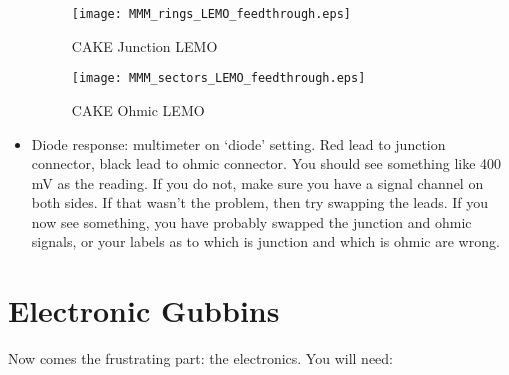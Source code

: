 \documentclass[11pt]{report}
\begin{document}
\begin{itemize}
\begin{figure}
\centering
 \texttt{[image: MMM\_rings\_LEMO\_feedthrough.eps]}
 \caption{CAKE Junction LEMO}
 \label{fig:CAKE_junction_LEMO}
\end{figure}

\begin{figure}
 \centering
 \texttt{[image: MMM\_sectors\_LEMO\_feedthrough.eps]}
 \caption{CAKE Ohmic LEMO}
 \label{fig:CAKE_ohmic_LEMO}
\end{figure}

\item Diode response: multimeter on ‘diode’ setting. Red lead to junction connector, black lead to ohmic connector. You should see something like 400 mV as the reading. If you do not, make sure you have a signal channel on both sides. If that wasn’t the problem, then try swapping the leads. If you now see something, you have probably swapped the junction and ohmic signals, or your labels as to which is junction and which is ohmic are wrong.

\end{itemize}


\section{Electronic Gubbins}

Now comes the frustrating part: the electronics. You will need:
\end{document}

